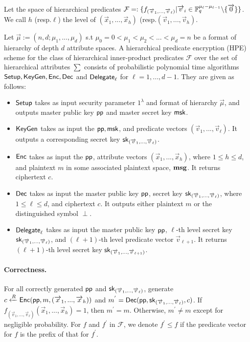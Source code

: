 Let the space of hierarchical predicates $\mathcal{F}=:\{f_{(\overrightarrow{v}_{1},...,\overrightarrow{v}_{\ell})}|\overrightarrow{v}_{i} \in \mathbb{F}^{\mu_{\ell}-\mu_{\ell-1}}_{q}\backslash \{\overrightarrow{0}\}\}$. We call $h$ (resp.$\ell$) the level of $(\overrightarrow{x}_{1},...,\overrightarrow{x}_{h})$ (resp.$(\overrightarrow{v}_{1},...,\overrightarrow{v}_{h})$.
\begin{definition}
Let $\overrightarrow{\mu}:=(n,d;\mu_{1},...,\mu_{d})$ s.t $\mu_{0}=0<\mu_{1}<\mu_{2}<...<\mu_{d}=n$ be a format of hierarchy of depth $d$ attribute spaces. A hierarchical predicate encryption (HPE) scheme for the class of hierarchical inner-product predicates $\mathcal{F}$ over the set of hierarchical attributes $\sum$ consists of probabilistic polynomial time algorithms $\mathsf{Setup}, \mathsf{KeyGen}, \mathsf{Enc}, \mathsf{Dec}$ and $\mathsf{Delegate}_{\ell}$ for $\ell=1,...,d-1$. They are given as follows:
\begin{itemize}
\item $\mathsf{Setup}$ takes as input security parameter $1^{\lambda}$ and format of hierarchy $\overrightarrow{\mu}$, and outputs master public key $\mathsf{pp}$ and master secret key $\mathsf{msk}$.
\item $\mathsf{KeyGen}$ takes as input the $\mathsf{pp}, \mathsf{msk}$, and predicate vectors $(\overrightarrow{v}_{1},...,\overrightarrow{v}_{\ell})$. It outputs a corresponding secret key $\mathsf{sk}_{(\overrightarrow{v}_{1},...,\overrightarrow{v}_{\ell})}$.
\item $\mathsf{Enc}$ takes as input the $\mathsf{pp}$, attribute vectors $(\overrightarrow{x}_{1},...,\overrightarrow{x}_{h})$, where $1\leq h \leq d$, and plaintext $m$ in some associated plaintext space, $\mathbf{msg}$. It returns ciphertext $c$.
\item $\mathsf{Dec}$ takes as input the master public key $\mathsf{pp}$, secret key $\mathsf{sk}_{(\overrightarrow{v}_{1},...,\overrightarrow{v}_{\ell})}$, where $1\leq \ell \leq d$, and ciphertext $c$. It outputs either plaintext $m$ or the distinguished symbol $\perp$.
\item $\mathsf{Delegate}_{\ell}$ takes as input the master public key $\mathsf{pp}$, $\ell$-th level secret key $\mathsf{sk}_{(\overrightarrow{v}_{1},...,\overrightarrow{v}_{\ell})}$, and $(\ell+1)$-th level predicate vector $\overrightarrow{v}_{\ell+1}$. It returns $(\ell+1)$-th level secret key $\mathsf{sk}_{(\overrightarrow{v}_{1},...,\overrightarrow{v}_{\ell+1})}$.
\end{itemize}
\end{definition}
\paragraph{Correctness.} For all correctly generated $\mathsf{pp}$ and $\mathsf{sk}_{(\overrightarrow{v}_{1},...,\overrightarrow{v}_{\ell})}$, generate $c \xleftarrow{R} \mathsf{Enc}(\mathsf{pp}, m, (\overrightarrow{x}_{1},...,\overrightarrow{x}_{h}))$ and $m^{'}= \mathsf{Dec}(\mathsf{pp}, \mathsf{sk}_{(\overrightarrow{v}_{1},...,\overrightarrow{v}_{\ell})}, c)$. If $f_{(\overrightarrow{v}_{1},...,\overrightarrow{v}_{\ell})}(\overrightarrow{x}_{1},...,\overrightarrow{x}_{h})=1$, then $m^{'}=m$. Otherwise, $m^{'}\neq m$ except for negligible probability. For $f$ and $f^{'}$ in $\mathcal{F}$, we denote $f^{'}\leq f$ if the predicate vector for $f$ is the prefix of that for $f^{'}$.

